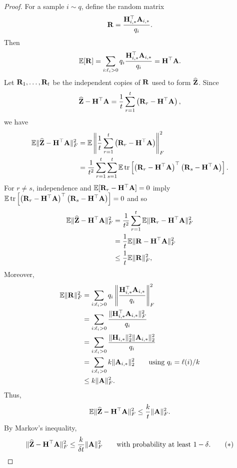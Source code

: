 \begin{proof}
For a sample \(i\sim q\), define the random matrix
\[
    \mathbf{R}=\frac{\mathbf{H}_{i,*}^{\top}\mathbf{A}_{i,*}}{q_{i}}.
\]
Then
\[
    \mathbb{E}[\mathbf{R}]
    =
    \sum_{i:\ell_i>0} q_i
    \frac{\mathbf{H}_{i,*}^{\top}\mathbf{A}_{i,*}}{q_i}
    =
    \mathbf{H}^\top\mathbf{A}.
\]
Let \(\mathbf{R}_1,\ldots,\mathbf{R}_t\) be the independent copies of \(\mathbf{R}\) used to
form \(\widehat{\mathbf{Z}}\). 
Since
\[
    \widehat{\mathbf{Z}}-\mathbf{H}^\top\mathbf{A}
    =
    \frac{1}{t}\sum_{r=1}^t
    \left(\mathbf{R}_r-\mathbf{H}^\top\mathbf{A}\right),
\]
we have
\[
\begin{aligned}
    \mathbb{E}\|\widehat{\mathbf{Z}}-\mathbf{H}^\top\mathbf{A}\|_F^2
    &=
    \mathbb{E}\left\|
        \frac{1}{t}\sum_{r=1}^t
        \left(\mathbf{R}_r-\mathbf{H}^\top\mathbf{A}\right)
    \right\|_F^2 \\
    &=
    \frac{1}{t^2}
    \sum_{r=1}^t\sum_{s=1}^t
    \mathbb{E}\operatorname{tr}\left[
        \left(\mathbf{R}_r-\mathbf{H}^\top\mathbf{A}\right)^\top
        \left(\mathbf{R}_s-\mathbf{H}^\top\mathbf{A}\right)
    \right].
\end{aligned}
\]
For \(r\neq s\), independence and
\(\mathbb{E}[\mathbf{R}_r-\mathbf{H}^\top\mathbf{A}]=0\) imply
\(
    \mathbb{E}\operatorname{tr}\left[
        \left(\mathbf{R}_r-\mathbf{H}^\top\mathbf{A}\right)^\top
        \left(\mathbf{R}_s-\mathbf{H}^\top\mathbf{A}\right)
    \right]
    =
    0
\)
and so
\[
\begin{aligned}
    \mathbb{E}\|\widehat{\mathbf{Z}}-\mathbf{H}^\top\mathbf{A}\|_F^2
    &=
    \frac{1}{t^2}
    \sum_{r=1}^t
    \mathbb{E}\|\mathbf{R}_r-\mathbf{H}^\top\mathbf{A}\|_F^2 \\
    &=
    \frac{1}{t}
    \mathbb{E}\|\mathbf{R}-\mathbf{H}^\top\mathbf{A}\|_F^2 \\
    &\leq
    \frac{1}{t}\mathbb{E}\|\mathbf{R}\|_F^2,
\end{aligned}
\]
Moreover,
\[
\begin{aligned}
    \mathbb{E}\|\mathbf{R}\|_F^2
    &=
    \sum_{i:\ell_i>0}
    q_i
    \left\|
        \frac{\mathbf{H}_{i,*}^{\top}\mathbf{A}_{i,*}}{q_i}
    \right\|_F^2  \\
    &=
    \sum_{i:\ell_i>0}
    \frac{\|\mathbf{H}_{i,*}^{\top}\mathbf{A}_{i,*}\|_F^2}{q_i}\\
    &=\sum_{i:\ell_i>0}\frac{\|\mathbf{H}_{i,*}\|_2^2\|\mathbf{A}_{i,*}\|_2^2}{q_i}\\
    &=\sum_{i:\ell_i>0} k\|\mathbf{A}_{i,*}\|_2^2
        \qquad\text{using \(q_i=\ell(i)/k\)}\\
    &\leq k\|\mathbf{A}\|_F^2 .
\end{aligned}
\]
Thus,
\[
    \mathbb{E}\|\widehat{\mathbf{Z}}-\mathbf{H}^\top\mathbf{A}\|_F^2
    \leq
    \frac{k}{t}\|\mathbf{A}\|_F^2.
\]
By Markov's inequality,
\[
    \|\widehat{\mathbf{Z}}-\mathbf{H}^\top\mathbf{A}\|_F^2
    \leq
    \frac{k}{\delta t}\|\mathbf{A}\|_F^2\qquad\text{with probability at least \(1-\delta\).}\tag{$\ast$}
\]


\end{proof}
